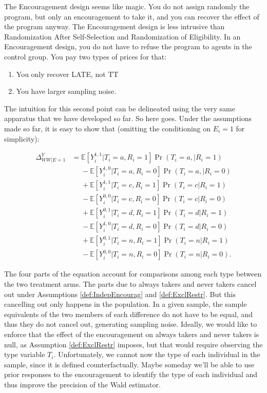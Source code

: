 \documentclass[]{book}
\providecommand{\tightlist}{%
  \setlength{\itemsep}{0pt}\setlength{\parskip}{0pt}}
\newcommand{\esp}[1]{\mathbb{E}[ #1 ]}
\theoremstyle{definition}
\theoremstyle{definition}
\theoremstyle{definition}
\theoremstyle{remark}
\let\BeginKnitrBlock\begin \let\EndKnitrBlock\end
\begin{document}
\BeginKnitrBlock{remark}
\iffalse{} {Remark. } \fi{}The Encouragement design seems like magic.
You do not assign randomly the program, but only an encouragement to
take it, and you can recover the effect of the program anyway. The
Encouragement design is less intrusive than Randomization After
Self-Selection and Randomization of Eligibility. In an Encouragement
design, you do not have to refuse the program to agents in the control
group. You pay two types of prices for that:
\EndKnitrBlock{remark}

\begin{enumerate}
\def\labelenumi{\arabic{enumi}.}
\tightlist
\item
  You only recover LATE, not TT
\item
  You have larger sampling noise.
\end{enumerate}

The intuition for this second point can be delineated using the very
same apparatus that we have developed so far. So here goes. Under the
assumptions made so far, it is easy to show that (omitting the
conditioning on \(E_i=1\) for simplicity):

\begin{align*}
  \Delta^Y_{WW|E=1} & = \esp{Y_i^{1,1}|T_i=a,R_i=1}\Pr(T_i=a,|R_i=1)\\
                    & \phantom{=}-\esp{Y_i^{1,0}|T_i=a,R_i=0}\Pr(T_i=a,|R_i=0)\\
                    & \phantom{=}+ \esp{Y_i^{1,1}|T_i=c,R_i=1}\Pr(T_i=c|R_i=1)\\
                    & \phantom{=}-\esp{Y_i^{0,0}|T_i=c,R_i=0}\Pr(T_i=c|R_i=0)\\
                    & \phantom{=}+ \esp{Y_i^{0,1}|T_i=d,R_i=1}\Pr(T_i=d|R_i=1)\\
                    & \phantom{=}-\esp{Y_i^{1,0}|T_i=d,R_i=0}\Pr(T_i=d|R_i=0)\\
                    & \phantom{=}+ \esp{Y_i^{0,1}|T_i=n,R_i=1}\Pr(T_i=n|R_i=1)\\
                    & \phantom{=}-\esp{Y_i^{0,0}|T_i=n,R_i=0}\Pr(T_i=n|R_i=0).
\end{align*}

The four parts of the equation account for comparisons among each type
between the two treatment arms. The parts due to always takers and never
takers cancel out under Assumptions \ref{def:IndepEncourag} and
\ref{def:ExclRestr}. But this cancelling out only happens in the
population. In a given sample, the sample equivalents of the two members
of each difference do not have to be equal, and thus they do not cancel
out, generating sampling noise. Ideally, we would like to enforce that
the effect of the encouragement on always takers and never takers is
null, as Assumption \ref{def:ExclRestr} imposes, but that would require
observing the type variable \(T_i\). Unfortunately, we cannot now the
type of each individual in the sample, since it is defined
counterfactually. Maybe someday we'll be able to use prior responses to
the encouragement to identify the type of each individual and thus
improve the precision of the Wald estimator.
\end{document}
